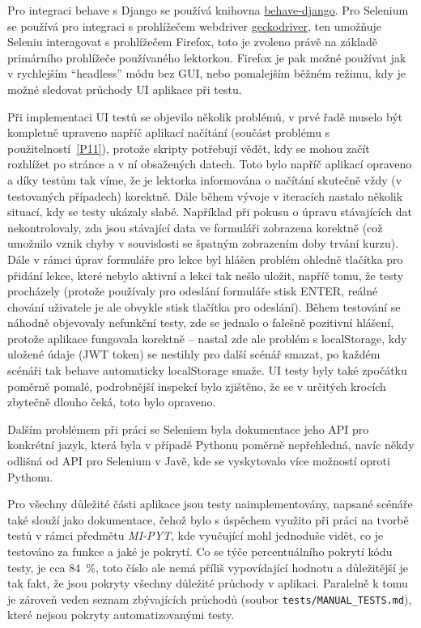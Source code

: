 Pro integraci behave s Django se používá knihovna \href{https://github.com/behave/behave-django}{behave-django}. Pro Selenium se používá pro integraci s prohlížečem webdriver \href{https://github.com/mozilla/geckodriver}{geckodriver}, ten umožňuje Seleniu interagovat s prohlížečem Firefox, toto je zvoleno právě na základě primárního prohlížeče používaného lektorkou. Firefox je pak možné používat jak v rychlejším \enquote{headless} módu bez GUI, nebo pomalejším běžném režimu, kdy je možné sledovat průchody UI aplikace při testu.

Při implementaci UI testů se objevilo několik problémů, v prvé řadě muselo být kompletně upraveno napříč aplikací načítání (součást problému s použitelností~\ref{P11}), protože skripty potřebují vědět, kdy se mohou začít rozhlížet po stránce a v ní obsažených datech. Toto bylo napříč aplikací opraveno a díky testům tak víme, že je lektorka informována o načítání skutečně vždy (v testovaných případech) korektně. Dále během vývoje v iteracích nastalo několik situací, kdy se testy ukázaly slabé. Například při pokusu o úpravu stávajících dat nekontrolovaly, zda jsou stávající data ve formuláři zobrazena korektně (což umožnilo vznik chyby v souvislosti se špatným zobrazením doby trvání kurzu). Dále v rámci úprav formuláře pro lekce byl hlášen problém ohledně tlačítka pro přidání lekce, které nebylo aktivní a lekci tak nešlo uložit, napříč tomu, že testy procházely (protože používaly pro odeslání formuláře stisk ENTER, reálné chování uživatele je ale obvykle stisk tlačítka pro odeslání). Během testování se náhodně objevovaly nefunkční testy, zde se jednalo o falešně pozitivní hlášení, protože aplikace fungovala korektně -- nastal zde ale problém s localStorage, kdy uložené údaje (JWT token) se nestihly pro další scénář smazat, po každém scénáři tak behave automaticky localStorage smaže. UI testy byly také zpočátku poměrně pomalé, podrobnější inspekcí bylo zjištěno, že se v určitých krocích zbytečně dlouho čeká, toto bylo opraveno.

Dalším problémem při práci se Seleniem byla dokumentace jeho API pro konkrétní jazyk, která byla v případě Pythonu poměrně nepřehledná, navíc někdy odlišná od API pro Selenium v Javě, kde se vyskytovalo více možností oproti Pythonu.

Pro všechny důležité části aplikace jsou testy naimplementovány, napsané scénáře také slouží jako dokumentace, čehož bylo s úspěchem využito při práci na tvorbě testů v rámci předmětu \textit{MI-PYT}, kde vyučující mohl jednoduše vidět, co je testováno za funkce a jaké je pokrytí. Co se týče percentuálního pokrytí kódu testy, je cca 84~\%, toto číslo ale nemá příliš vypovídající hodnotu a důležitější je tak fakt, že jsou pokryty všechny důležité průchody v aplikaci. Paralelně k tomu je zároveň veden seznam zbývajících průchodů (soubor \verb|tests/MANUAL_TESTS.md|), které nejsou pokryty automatizovanými testy.

